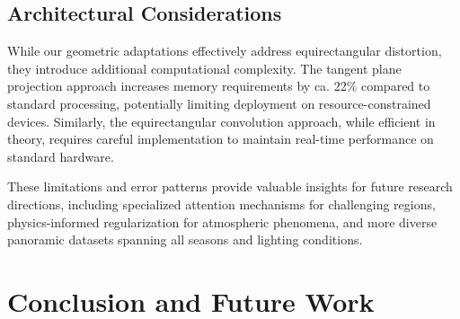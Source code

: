 \documentclass[conference]{IEEEtran}
\begin{document}
\subsection{Architectural Considerations}

While our geometric adaptations effectively address equirectangular distortion, they introduce additional computational complexity. The tangent plane projection approach increases memory requirements by ca. 22\% compared to standard processing, potentially limiting deployment on resource-constrained devices. Similarly, the equirectangular convolution approach, while efficient in theory, requires careful implementation to maintain real-time performance on standard hardware.

These limitations and error patterns provide valuable insights for future research directions, including specialized attention mechanisms for challenging regions, physics-informed regularization for atmospheric phenomena, and more diverse panoramic datasets spanning all seasons and lighting conditions.


\section{Conclusion and Future Work}\label{sec:conclusion}


\end{document}
